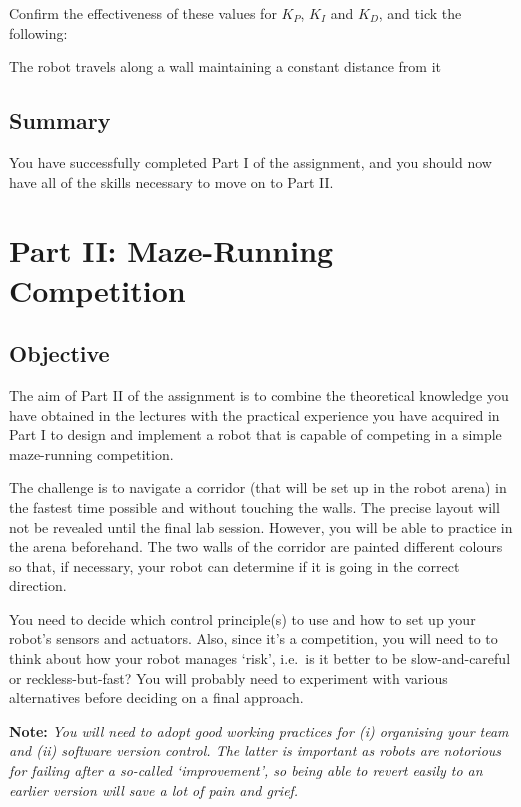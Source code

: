 \documentclass[hidelinks,a4paper,11pt]{article}
\newcommand{\cmark}{\ding{51}}%
\newcommand{\done}{\rlap{$\square$}{\raisebox{2pt}{\large\hspace{1pt}\cmark}}
\hspace{-2.5pt}}
\begin{document}
Confirm the effectiveness of these values for $K_P$, $K_I$ and $K_D$, and tick the following:
\begin{todolist}
	\item[\done] The robot travels along a wall maintaining a constant distance from it
\end{todolist}


\subsection{Summary}

You have successfully completed Part I of the assignment, and you should now have all of the skills
necessary to move on to Part II.


\newpage
\section{Part II: Maze-Running Competition}

\subsection{Objective}

The aim of Part II of the assignment is to combine the theoretical knowledge you have obtained in
the lectures with the practical experience you have acquired in Part I to design and implement a
robot that is capable of competing in a simple maze-running competition.

The challenge is to navigate a corridor (that will be set up in the robot arena) in the fastest time
possible and without touching the walls.  The precise layout will not be revealed until the final
lab session.  However, you will be able to practice in the arena beforehand.  The two walls of the
corridor are painted different colours so that, if necessary, your robot can determine if it is
going in the correct direction.

You need to decide which control principle(s) to use and how to set up your robot's sensors and
actuators.  Also, since it's a competition, you will need to to think about how your robot manages
`risk', i.e.\ is it better to be slow-and-careful or reckless-but-fast?  You will probably need to
experiment with various alternatives before deciding on a final approach.

{\bfseries Note:}  \emph{You will need to adopt good working practices for (i) organising your team
and (ii) software version control.  The latter is important as robots are notorious for failing
after a so-called `improvement', so being able to revert easily to an earlier version will save a
lot of pain and grief.}
\end{document}
